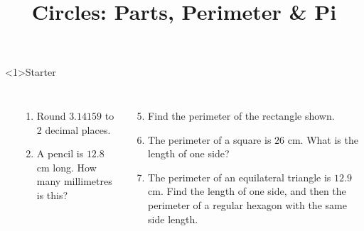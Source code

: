 \documentclass{beamer}
\title{Circles: Parts, Perimeter \& Pi}
\author{}
\date{}
\newcommand{\ablank}[1]{%
  \alt<2>{\textcolor{red}{#1}}{\underline{\phantom{#1}}}%
}
\newcommand{\ashow}[1]{\uncover<2->{\textcolor{red}{\small #1}}}
\newcommand{\ashowq}[1]{\alt<2->{\textcolor{red}{\small #1}}{?}}
\begin{document}

\begin{frame}<1>{Starter}


\begin{columns}

\begin{center}
\end{center}

\small
\begin{enumerate}
  \item Round $3.14159$ to 2 decimal places. \ashow{3.14}
  \item A pencil is $12.8$ cm long. How many millimetres is this? \ablank{128 mm}
\end{enumerate}

\begin{enumerate}
  \setcounter{enumi}{4}
  \item Find the perimeter of the rectangle shown. \ashow{25.4 cm}
  \item The perimeter of a square is $26$ cm. What is the length of one side? \ashow{6.5 cm}
  \item  The perimeter of an equilateral triangle is $12.9$ cm. 
    Find the length of one side, and then the perimeter of a regular hexagon with the same side length. \ashow{$4.3$ cm; hexagon: $25.8$ cm}
\end{enumerate}

\end{columns}
\end{frame}
\end{document}
